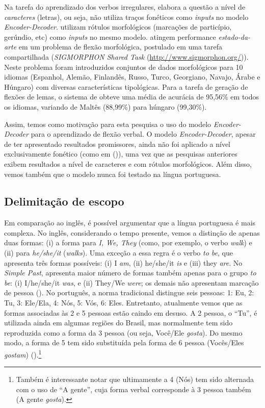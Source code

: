 Na tarefa do aprendizado dos verbos irregulares, \cite{faruqui:2015} elabora a questão a nível de \textit{caracteres} (letras), ou seja, não utiliza traços fonéticos como \textit{inputs} no modelo \textit{Encoder-Decoder}. \cite{kann-schutze-2016-med} utilizam rótulos morfológicos (marcações de particípio, gerúndio, etc) como \textit{inputs} no mesmo modelo. \cite{cotterell-sigmorphon2016} atingem performance \textit{estado-da-arte} em um problema de flexão morfológica, postulado em uma tarefa compartilhada (\textit{SIGMORPHON Shared Task} (\url{http://www.sigmorphon.org/})). Neste problema foram introduzidos conjuntos de dados morfológicos para 10 idiomas (Espanhol, Alemão, Finlandês, Russo, Turco, Georgiano, Navajo, Árabe e Húngaro) com diversas características tipológicas. Para a tarefa de geração de flexões de lemas, o sistema de \cite{cotterell-sigmorphon2016} obteve uma média de acurácia de 95,56\% em todos os idiomas, variando de
Maltês (88,99\%) para húngaro (99,30\%).

Assim, temos como motivação para esta pesquisa o uso do modelo \textit{Encoder-Decoder} para o aprendizado de flexão verbal. O modelo \textit{Encoder-Decoder}, apesar de ter apresentado resultados promissores, ainda não foi aplicado a nível exclusivamente fonético (como em (\cite{rumelhart:1986})), uma vez que as pesquisas anteriores exibem resultados a nível de caracteres e com rótulos morfológicos. Além disso, vemos também que o modelo nunca foi testado na língua portuguesa.


\subsection{Delimitação de escopo}
\label{sec:escopo}

Em comparação ao inglês, é possível argumentar que a língua portuguesa é mais complexa. No inglês, considerando o tempo presente, vemos a distinção de apenas duas formas: (i) a forma para \textit{I, We, They} (como, por exemplo, o verbo \textit{walk}) e (ii) para \textit{he/she/it }(\textit{walks}). Uma exceção a essa regra é o verbo \textit{to be}, que apresenta três formas possíveis: (i) I \textit{am}, (ii) he/she/it \textit{is} e (iii) they \textit{are}. No \textit{Simple Past}, apresenta maior número de formas também apenas para o grupo \textit{to be}: (i) I/he/she/it \textit{was}, e (ii) They/We \textit{were}; os demais não apresentam marcação de pessoa (\cite{Nelson:2010}). No português, a norma tradicional distingue seis pessoas: 1: Eu, 2: Tu, 3: Ele/Ela, 4: Nós, 5: Vós, 6: Eles. Entretanto, atualmente vemos que as formas associadas às 2 e 5 pessoas estão caindo em desuso. A 2 pessoa, o “Tu”, é utilizada ainda em algumas regiões do Brasil, mas normalmente tem sido reproduzida como a forma da 3 pessoa (ou seja, Você/Ele \textit{gosta}). Do mesmo modo, a forma de 5 tem sido substituída pela forma de 6 pessoa (Vocês/Eles \textit{gostam}) (\cite{1999:camara}).\footnote{Também é interessante notar que ultimamente a 4 (Nós) tem sido alternada com o uso de “A gente”, cuja forma verbal corresponde à 3 pessoa também (A gente \textit{gosta}).}

